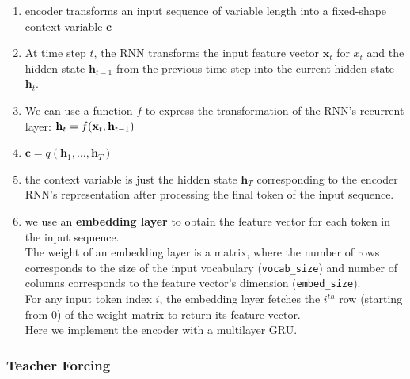 \begin{enumerate}
    \item encoder transforms an input sequence of variable length into a fixed-shape context variable $\mathbf{c}$

    \item At time step $t$, the RNN transforms the input feature vector $\mathbf{x}_t$ for $x_t$ and the hidden state $\mathbf{h}_{t-1}$ from the previous time step into the current hidden state $\mathbf{h}_{t}$. 
    
    \item We can use a function $f$ to express the transformation of the RNN’s recurrent layer:
    $
        \hfill
        \mathbf{h}_t = f(\mathbf{x}_t, \mathbf{h}_{t-1})
        \hfill
    $

    \item $\mathbf{c} =  q(\mathbf{h}_1, \ldots, \mathbf{h}_T)$

    \item the context variable is just the hidden state $\mathbf{h}_T$ corresponding to the encoder RNN’s representation after processing the final token of the input sequence.

    \item we use an \textbf{embedding layer} to obtain the feature vector for each token in the input sequence.\\
    The weight of an embedding layer is a matrix, where the number of rows corresponds to the size of the input vocabulary (\verb|vocab_size|) and number of columns corresponds to the feature vector’s dimension (\verb|embed_size|).\\
    For any input token index $i$, the embedding layer fetches the $i^{th}$ row (starting from 0) of the weight matrix to return its feature vector.\\
    Here we implement the encoder with a multilayer GRU.
\end{enumerate}


\subsubsection{Teacher Forcing \cite{dnn-1}} \label{Teacher Forcing}

